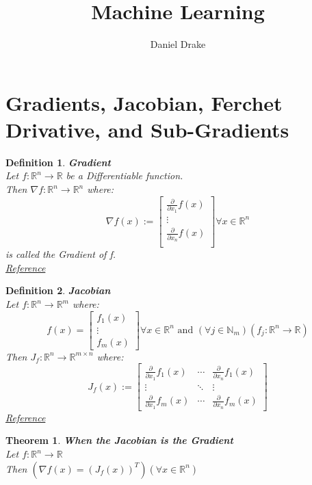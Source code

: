 \documentclass[12pt]{extarticle}
\title{Machine Learning}
\author{Daniel Drake}
\theoremstyle{plain}
\newtheorem{thm}{Theorem}[section]
\theoremstyle{Definition}
\newtheorem{def.}{Definition}[section]
\theoremstyle{Definition}
\theoremstyle{plain}
\begin{document}
		\maketitle			
\section{Gradients, Jacobian, Ferchet Drivative, and Sub-Gradients} 
\begin{def.} \textbf{Gradient} \\ 
	Let $f : \mathbb{R}^n \to \mathbb{R}$ be a Differentiable function. \\ 
	Then $\nabla f: \mathbb{R}^n \to \mathbb{R}^n$ where: \\ 
	\[
	\nabla f(x) := 
	\begin{bmatrix}
	\frac{\partial }{\partial x_1}f(x) \\ 
	\vdots \\
	\frac{\partial }{\partial x_n}f(x) \\ 				
	\end{bmatrix}
	\forall x \in \mathbb{R}^n
	\]
	is called the Gradient of f. \\
	\href{https://en.wikipedia.org/wiki/Gradient}{Reference}
\end{def.}

\begin{def.} \textbf{Jacobian} \\ 
	Let $f : \mathbb{R}^n \to \mathbb{R}^m$ where: 
	\[
	f(x) = 
	\begin{bmatrix}
	f_1(x) \\ 
	\vdots \\ 
	f_m(x) 
	\end{bmatrix}
	\forall x \in \mathbb{R}^n \text{ and } (\forall j \in \mathbb{N}_m) (f_j : \mathbb{R}^n \to \mathbb{R}) 
	\]
	Then $J_f : \mathbb{R}^n \to \mathbb{R}^{m \times n}$ where: \\  
	\[
	J_f(x) := 
	\begin{bmatrix} 
	\frac{\partial }{\partial x_1}f_1(x) & \cdots & \frac{\partial }{\partial x_n}f_1(x) \\
	\vdots & \ddots & \vdots \\ 
	\frac{\partial }{\partial x_1}f_m(x) & \cdots & \frac{\partial }{\partial x_n}f_m(x) 
	\end{bmatrix}
	\]
	\href{https://en.wikipedia.org/wiki/Jacobian_matrix_and_determinant}{Reference}
\end{def.}

\begin{thm} \textbf{When the Jacobian is the Gradient} \\
	Let $f : \mathbb{R}^n \to \mathbb{R}$ \\ 
	Then $(\nabla f(x) = (J_f(x))^T) (\forall x \in \mathbb{R}^n)$ \\ 	
\end{thm}
\end{document}
